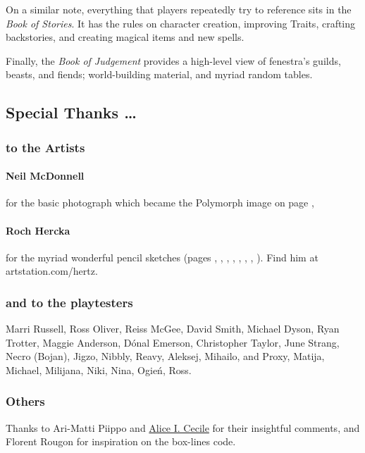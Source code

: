 \begin{multicols}{2}
On a similar note, everything that players repeatedly try to reference sits in the \textit{Book of Stories}.
It has the rules on character creation, improving Traits, crafting backstories, and creating magical items and new spells.

Finally, the \textit{Book of Judgement} provides a high-level view of \gls{fenestra}'s guilds, beasts, and fiends; world-building material, and myriad random tables.

\subsection*{Special Thanks \ldots}

\subsubsection*{to the Artists}

\paragraph{Neil McDonnell} for the basic photograph which became the Polymorph image on page \pageref{Roch_Hercka/polymorph},

\paragraph{Roch Hercka} for the myriad wonderful pencil sketches (pages 
\pageref{Roch_Hercka/dwarf_encumbrance}, 
\pageref{Roch_Hercka/cave_fight}, 
\pageref{Roch_Hercka/stances}, 
\pageref{Roch_Hercka/vitals_shot}, 
\pageref{Roch_Hercka/conjuration_right}, 
\pageref{Roch_Hercka/polymorph}, 
\pageref{Roch_Hercka/dwarvish_runes}, 
\pageref{Roch_Hercka/flashing_light}
).
Find him at artstation.com/hertz.

\subsubsection*{and to the playtesters} Marri Russell, Ross Oliver, Reiss McGee, David Smith, Michael Dyson, Ryan Trotter, Maggie Anderson, 
D\'{o}nal Emerson, Christopher Taylor, June Strang, 
Necro (Bojan), Jigzo, Nibbly, Reavy, 
Aleksej, Mihailo, and Proxy,
Matija, Michael, Milijana, Niki, Nina, Ogie\'n, Ross.

\subsubsection*{Others}
Thanks to Ari-Matti Piippo and \href{https://www.twitter.com/AliceICecile}{Alice I. Cecile} for their insightful comments,
and Florent Rougon for inspiration on the box-lines code.


\end{multicols}
